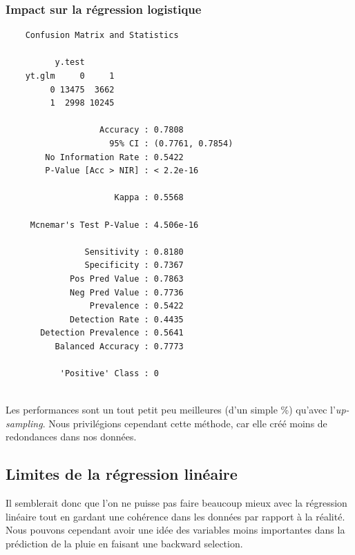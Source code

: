 \documentclass{article}
\begin{document}
\subsubsection{Impact sur la régression logistique}
\begin{multicols}{2}
    \begin{verbatim}
    Confusion Matrix and Statistics
  
          y.test
    yt.glm     0     1
         0 13475  3662
         1  2998 10245
                                              
                   Accuracy : 0.7808          
                     95% CI : (0.7761, 0.7854)
        No Information Rate : 0.5422          
        P-Value [Acc > NIR] : < 2.2e-16       
                                              
                      Kappa : 0.5568          
                                              
     Mcnemar's Test P-Value : 4.506e-16       
                                              
                Sensitivity : 0.8180          
                Specificity : 0.7367          
             Pos Pred Value : 0.7863          
             Neg Pred Value : 0.7736          
                 Prevalence : 0.5422          
             Detection Rate : 0.4435          
       Detection Prevalence : 0.5641          
          Balanced Accuracy : 0.7773          

           'Positive' Class : 0 
                                 
    \end{verbatim}
\end{multicols}

Les performances sont un tout petit peu meilleures (d'un simple \%) qu'avec l'\emph{up-sampling}. Nous privilégions cependant cette méthode, car elle créé moins de redondances dans nos données. 

\subsection{Limites de la régression linéaire}

Il semblerait donc que l'on ne puisse pas faire beaucoup mieux avec la régression linéaire tout en gardant une cohérence dans les données par rapport à la réalité. Nous pouvons cependant avoir une idée des variables moins importantes dans la prédiction de la pluie en faisant une backward selection. 
\end{document}
